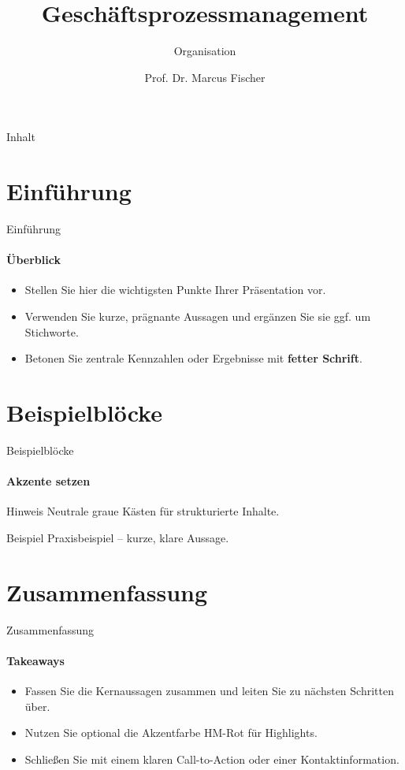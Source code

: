 \documentclass[aspectratio=169,10pt]{beamer}
\title[Geschäftsprozessmanagement – Organisation]{Geschäftsprozessmanagement}
\subtitle{Organisation}
\author{Prof. Dr. Marcus Fischer}
\date{}
\begin{document}
\begin{frame}[plain]
  \titlepage
\end{frame}

\begin{frame}{Inhalt}
  \tableofcontents
\end{frame}

\section{Einführung}
\begin{frame}{Einführung}
\framesubtitle{Überblick}
\begin{itemize}
  \item Stellen Sie hier die wichtigsten Punkte Ihrer Präsentation vor.
  \item Verwenden Sie kurze, prägnante Aussagen und ergänzen Sie sie ggf. um Stichworte.
  \item Betonen Sie zentrale Kennzahlen oder Ergebnisse mit \textbf{fetter Schrift}.
\end{itemize}
\end{frame}

\section{Beispielblöcke}
\begin{frame}{Beispielblöcke}
\framesubtitle{Akzente setzen}
\begin{block}{Hinweis}
  Neutrale graue Kästen für strukturierte Inhalte.
\end{block}
\begin{exampleblock}{Beispiel}
  Praxisbeispiel – kurze, klare Aussage.
\end{exampleblock}
\end{frame}

\section{Zusammenfassung}
\begin{frame}{Zusammenfassung}
\framesubtitle{Takeaways}
\begin{itemize}
  \item Fassen Sie die Kernaussagen zusammen und leiten Sie zu nächsten Schritten über.
  \item Nutzen Sie optional die Akzentfarbe \textcolor{HMRed}{HM-Rot} für Highlights.
  \item Schließen Sie mit einem klaren Call-to-Action oder einer Kontaktinformation.
\end{itemize}
\end{frame}
\end{document}
